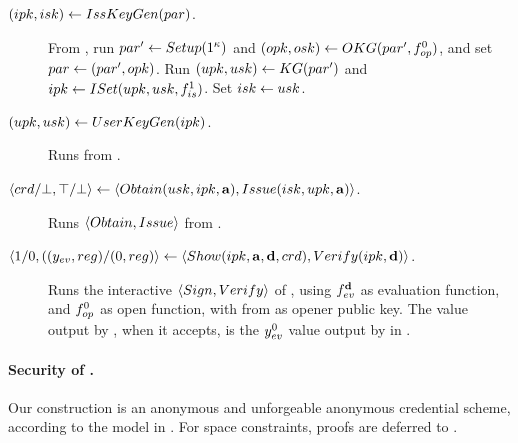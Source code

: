 \begin{description}
\item[$(ipk,isk) \gets IssKeyGen(par)$.] From \CUASGenInt, run $par'
  \gets Setup(1^\kappa)$ and $(opk,osk) \gets OKG(par',
  f_{op}^0)$, and set $par \gets (par',opk)$. Run $(upk,usk) \gets
  KG(par')$ and $ipk \gets ISet(upk,usk,f_{is}^1)$. Set $isk \gets
  usk$.
\item[$(upk,usk) \gets UserKeyGen(ipk)$.] Runs \KeyGen from \CUASGenInt.
\item[$\langle crd/\bot,\top/\bot \rangle \gets
  \langle Obtain(usk,ipk,\mathbf{a}),Issue(isk,upk,\mathbf{a}) \rangle$.]
  Runs $\langle Obtain,Issue \rangle$ from \CUASGenInt.
\item[$\langle 1/0,((y_{ev},reg)/(0,reg)\rangle
  \gets \langle Show(ipk,\mathbf{a},\mathbf{d},
  crd),Verify(ipk,\mathbf{d}) \rangle$.]
  Runs the interactive $\langle Sign, Verify\rangle$ of  \CUASGenInt,
  using $f_{ev}^{\mathbf{d}}$ as evaluation function, and $f_{op}^0$ as
  open function, with \opk from \parm as opener public key. The \yeval value
  output by \Verify, when it accepts, is the $y_{ev}^0$ value output by
  \Sign in \CUASGenInt.
\end{description}

\paragraph{Security of \CUASAC.} %
Our \CUASAC construction is an anonymous and unforgeable anonymous credential
scheme, according to the model in \cite{fhs19}. For space constraints,
proofs are deferred to .



